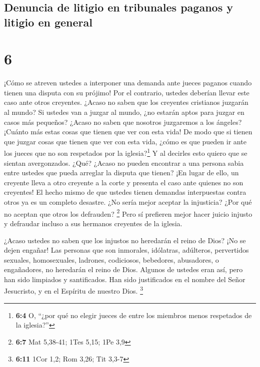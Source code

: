 \hypertarget{denuncia-de-litigio-en-tribunales-paganos-y-litigio-en-general}{%
\subsection{Denuncia de litigio en tribunales paganos y litigio en
general}\label{denuncia-de-litigio-en-tribunales-paganos-y-litigio-en-general}}

\hypertarget{section-5}{%
\section{6}\label{section-5}}

 ¡Cómo se atreven ustedes a interponer una demanda ante
jueces paganos cuando tienen una disputa con su prójimo! Por el
contrario, ustedes deberían llevar este caso ante otros creyentes.
 ¿Acaso no saben que los creyentes cristianos juzgarán al
mundo? Si ustedes van a juzgar al mundo, ¿no estarán aptos para juzgar
en casos más pequeños?  ¿Acaso no saben que nosotros
juzgaremos a los ángeles? ¡Cuánto más estas cosas que tienen que ver con
esta vida!  De modo que si tienen que juzgar cosas que
tienen que ver con esta vida, ¿cómo es que pueden ir ante los jueces que
no son respetados por la iglesia?\footnote{\textbf{6:4} O, ``¿por qué no
  elegir jueces de entre los miembros menos respetados de la iglesia?''}
 Y al decirles esto quiero que se sientan avergonzados.
¿Qué? ¿Acaso no pueden encontrar a una persona sabia entre ustedes que
pueda arreglar la disputa que tienen?  ¡En lugar de ello,
un creyente lleva a otro creyente a la corte y presenta el caso ante
quienes no son creyentes!  El hecho mismo de que ustedes
tienen demandas interpuestas contra otros ya es un completo desastre.
¿No sería mejor aceptar la injusticia? ¿Por qué no aceptan que otros los
defrauden? \footnote{\textbf{6:7} Mat 5,38-41; 1Tes 5,15; 1Pe 3,9}
 Pero sí prefieren mejor hacer juicio injusto y defraudar
incluso a sus hermanos creyentes de la iglesia.

 ¿Acaso ustedes no saben que los injustos no heredarán el
reino de Dios? ¡No se dejen engañar! Las personas que son inmorales,
idólatras, adúlteros, pervertidos sexuales, homosexuales,
 ladrones, codiciosos, bebedores, abusadores, o
engañadores, no heredarán el reino de Dios.  Algunos de
ustedes eran así, pero han sido limpiados y santificados. Han sido
justificados en el nombre del Señor Jesucristo, y en el Espíritu de
nuestro Dios. \footnote{\textbf{6:11} 1Cor 1,2; Rom 3,26; Tit 3,3-7}

